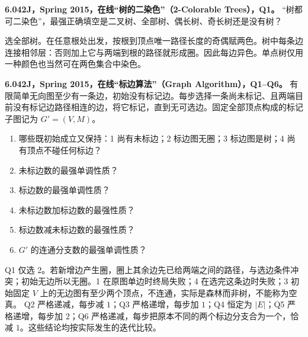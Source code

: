 \begin{exercise}\label{mit:6042-online-2-colorable-trees-q1}
\textbf{6.042J，Spring 2015，在线“树的二染色”（2-Colorable Trees），Q1。}
“\underline{\hspace{1em}}树都可二染色”，最强正确填空是二叉树、全部树、偶长树、奇长树还是没有树？
\end{exercise}
\begin{solution}
选全部树。在任意根处出发，按根到顶点唯一路径长度的奇偶赋两色。树中每条边连接相邻层：否则加上它与两端到根的路径就形成圈。因此每边异色。单点树仅用一种颜色也当然可在两色集合中染色。
\end{solution}

\begin{exercise}
\textbf{6.042J，Spring 2015，在线“标边算法”（Graph Algorithm），Q1--Q6。}
有限简单无向图至少有一条边，初始没有标记边。每步选择一条尚未标记、且两端目前没有标记边路径相连的边，将它标记，直到无可选边。固定全部顶点构成的标记子图记为 $G'=(V,M)$。
\begin{enumerate}[label=Q\arabic*.]
\item\label{mit:6042-online-graph-algorithm-q1} 哪些既初始成立又保持：1 尚有未标边；2 标边图无圈；3 标边图是树；4 尚有顶点不碰任何标边？
\item\label{mit:6042-online-graph-algorithm-q2} 未标边数的最强单调性质？
\item\label{mit:6042-online-graph-algorithm-q3} 标边数的最强单调性质？
\item\label{mit:6042-online-graph-algorithm-q4} 未标边数加标边数的最强性质？
\item\label{mit:6042-online-graph-algorithm-q5} 标边数减未标边数的最强性质？
\item\label{mit:6042-online-graph-algorithm-q6} $G'$ 的连通分支数的最强单调性质？
\end{enumerate}
\end{exercise}
\begin{solution}
Q1 仅选 2。若新增边产生圈，圈上其余边先已给两端之间的路径，与选边条件冲突；初始无边所以无圈。1 在原图单边时终局失败；4 在选完这条边时失败；3 初始固定 $V$ 上的无边图有至少两个顶点，不连通，实际是森林而非树，不能称为空真。
Q2 严格递减，每步减 $1$；Q3 严格递增，每步加 $1$；Q4 恒定为 $|E|$；Q5 严格递增，每步加 $2$；Q6 严格递减，每步把原本不同的两个标边分支合为一个，恰减 $1$。这些结论均按实际发生的迭代比较。
\end{solution}

